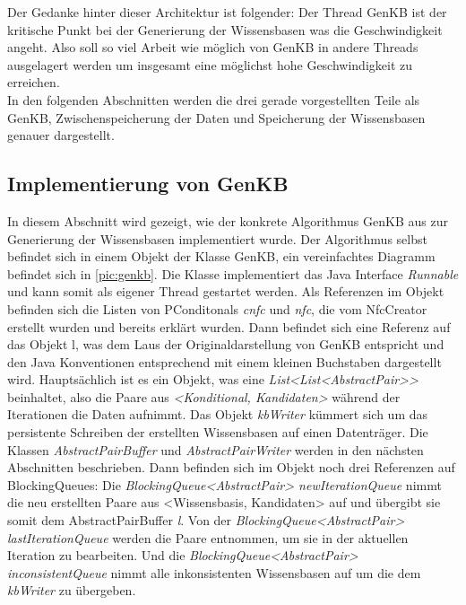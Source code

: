 \documentclass[12pt,a4paper]{article}
\begin{document}
Der Gedanke hinter dieser Architektur ist folgender: Der Thread GenKB ist der kritische Punkt bei der Generierung der Wissensbasen was die Geschwindigkeit angeht. Also soll so viel Arbeit wie möglich von GenKB in andere Threads ausgelagert werden um insgesamt eine möglichst hohe Geschwindigkeit zu erreichen.\\
In den folgenden Abschnitten werden die drei gerade vorgestellten Teile als GenKB, Zwischenspeicherung der Daten und Speicherung der Wissensbasen genauer dargestellt.



\subsection{Implementierung von GenKB}





In diesem Abschnitt wird gezeigt, wie der konkrete Algorithmus GenKB aus \cite{beierle19} zur Generierung der Wissensbasen implementiert wurde. Der Algorithmus selbst befindet sich in einem Objekt der Klasse GenKB, ein vereinfachtes Diagramm befindet sich in \autoref{pic:genkb}. Die Klasse implementiert das Java Interface \textit{Runnable} und kann somit als eigener Thread gestartet werden. Als Referenzen im Objekt befinden sich die Listen von PConditonals \textit{cnfc} und \textit{nfc}, die vom NfcCreator erstellt wurden und bereits erklärt wurden. Dann befindet sich eine Referenz auf das Objekt \glqq l\grqq , was dem \glqq L\grqq \space aus der Originaldarstellung von GenKB entspricht und den Java Konventionen entsprechend mit einem kleinen Buchstaben dargestellt wird. Hauptsächlich ist es ein Objekt, was eine \textit{List<List<AbstractPair>>} beinhaltet, also die Paare aus \textit{<Konditional, Kandidaten>} während der Iterationen die Daten aufnimmt. Das Objekt \textit{kbWriter} kümmert sich um das persistente Schreiben der erstellten Wissensbasen auf einen Datenträger. Die Klassen \textit{AbstractPairBuffer} und \textit{AbstractPairWriter} werden in den nächsten Abschnitten beschrieben. Dann befinden sich im Objekt noch drei Referenzen auf BlockingQueues: Die \textit{BlockingQueue<AbstractPair> newIterationQueue} nimmt die neu erstellten Paare aus <Wissensbasis, Kandidaten> auf und übergibt sie somit dem AbstractPairBuffer \textit{l}.
Von der \textit{BlockingQueue<AbstractPair> lastIterationQueue} werden die Paare entnommen, um sie in der aktuellen Iteration zu bearbeiten. Und die \textit{BlockingQueue<AbstractPair> inconsistentQueue} nimmt alle inkonsistenten Wissensbasen auf um die dem \textit{kbWriter} zu übergeben. \\
\end{document}
